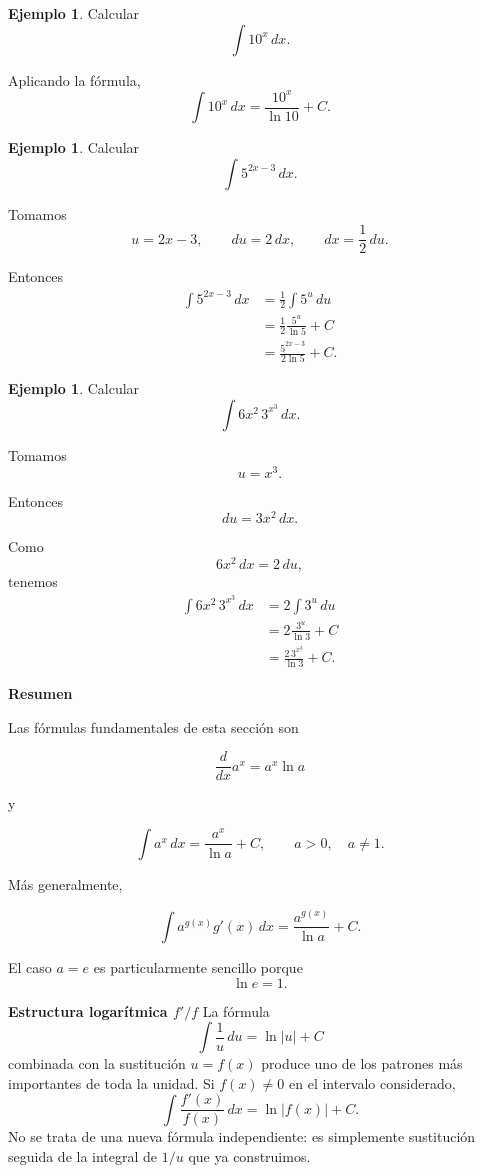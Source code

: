 \documentclass[12pt]{article}
\theoremstyle{definition}
\newtheorem{ejemplo}[teorema]{Ejemplo}
\theoremstyle{remark}
\begin{document}
\begin{ejemplo}
Calcular
\[
\int 10^x\,dx.
\]

Aplicando la fórmula,
\[
\boxed{
\int 10^x\,dx
=
\frac{10^x}{\ln 10}+C
}.
\]
\end{ejemplo}

\begin{ejemplo}
Calcular
\[
\int 5^{2x-3}\,dx.
\]

Tomamos
\[
u=2x-3,
\qquad
du=2\,dx,
\qquad
dx=\frac{1}{2}\,du.
\]

Entonces
\[
\begin{aligned}
\int 5^{2x-3}\,dx
&=
\frac{1}{2}\int 5^u\,du
\\
&=
\frac{1}{2}
\frac{5^u}{\ln5}+C
\\
&=
\boxed{
\frac{5^{2x-3}}{2\ln5}+C
}.
\end{aligned}
\]
\end{ejemplo}

\begin{ejemplo}
Calcular
\[
\int 6x^2\,3^{x^3}\,dx.
\]

Tomamos
\[
u=x^3.
\]

Entonces
\[
du=3x^2\,dx.
\]

Como
\[
6x^2\,dx=2\,du,
\]
tenemos
\[
\begin{aligned}
\int 6x^2\,3^{x^3}\,dx
&=
2\int3^u\,du
\\
&=
2\frac{3^u}{\ln3}+C
\\
&=
\boxed{
\frac{2\,3^{x^3}}{\ln3}+C
}.
\end{aligned}
\]
\end{ejemplo}


\textbf{Resumen}

Las fórmulas fundamentales de esta sección son

\[
\boxed{
\frac{d}{dx}a^x
=
a^x\ln a
}
\]

y

\[
\boxed{
\int a^x\,dx
=
\frac{a^x}{\ln a}+C
},
\qquad
a>0,\quad a\neq1.
\]

Más generalmente,

\[
\boxed{
\int a^{g(x)}g'(x)\,dx
=
\frac{a^{g(x)}}{\ln a}+C
}.
\]

El caso \(a=e\) es particularmente sencillo porque
\[
\ln e=1.
\]

\textbf*{Estructura logarítmica $f'/f$}
La fórmula
\[
\int\frac1u\,du=\ln|u|+C
\]
combinada con la sustitución $u=f(x)$ produce uno de los patrones más importantes de toda la unidad. Si $f(x)\neq0$ en el intervalo considerado,
\[
\boxed{\int\frac{f'(x)}{f(x)}\,dx=\ln|f(x)|+C.}
\]
No se trata de una nueva fórmula independiente: es simplemente sustitución seguida de la integral de $1/u$ que ya construimos.
\end{document}
